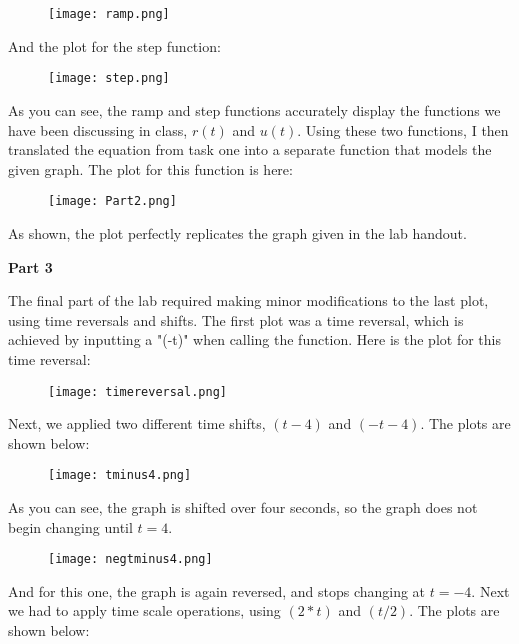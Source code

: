 \documentclass[12pt]{report}
\begin{document}
{\begin{figure}[H]
    \centering
    \texttt{[image: ramp.png]}
\end{figure}

\noindent And the plot for the step function:

\begin{figure}[H]
    \centering
    \texttt{[image: step.png]}
\end{figure}

\noindent As you can see, the ramp and step functions accurately display the functions we have been discussing in class, $r(t)$ and $u(t)$. Using these two functions, I then translated the equation from task one into a separate function that models the given graph. The plot for this function is here:

\begin{figure}[H]
    \centering
    \texttt{[image: Part2.png]}
\end{figure}

\noident As shown, the plot perfectly replicates the graph given in the lab handout.

\noindent \textbf{Part 3}

The final part of the lab required making minor modifications to the last plot, using time reversals and shifts. The first plot was a time reversal, which is achieved by inputting a "(-t)" when calling the function. Here is the plot for this time reversal:

\begin{figure}[H]
    \centering
    \texttt{[image: timereversal.png]}
\end{figure}

\noindent Next, we applied two different time shifts, $(t-4)$ and $(-t-4)$. The plots are shown below:

\begin{figure}[H]
    \centering
    \texttt{[image: tminus4.png]}
\end{figure}

\noindent As you can see, the graph is shifted over four seconds, so the graph does not begin changing until $t = 4$.

\begin{figure}[H]
    \centering
    \texttt{[image: negtminus4.png]}
\end{figure}

\noindent And for this one, the graph is again reversed, and stops changing at $t = -4$. Next we had to apply time scale operations, using $(2*t)$ and $(t/2)$. The plots are shown below:

}
\end{document}

